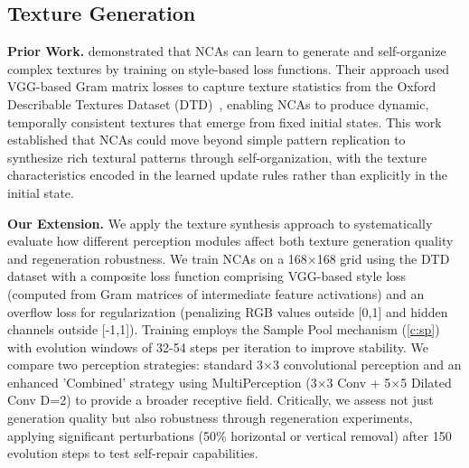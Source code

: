 \documentclass[10pt]{article} %
\begin{document}
\subsection{Texture Generation}
\label{sec:texture}
\noindent\textbf{Prior Work.}
\citep{niklasson2021self-organising} demonstrated that NCAs can learn to generate and self-organize complex textures by training on style-based loss functions. Their approach used VGG-based Gram matrix losses to capture texture statistics from the Oxford Describable Textures Dataset (DTD)~\citep{cimpoi14describing}, enabling NCAs to produce dynamic, temporally consistent textures that emerge from fixed initial states. This work established that NCAs could move beyond simple pattern replication to synthesize rich textural patterns through self-organization, with the texture characteristics encoded in the learned update rules rather than explicitly in the initial state.

\noindent\textbf{Our Extension.}
We apply the texture synthesis approach to systematically evaluate how different perception modules affect both texture generation quality and regeneration robustness. We train NCAs on a 168×168 grid using the DTD dataset with a composite loss function comprising VGG-based style loss (computed from Gram matrices of intermediate feature activations) and an overflow loss for regularization (penalizing RGB values outside [0,1] and hidden channels outside [-1,1]). Training employs the Sample Pool mechanism (\cref{c:sp}) with evolution windows of 32-54 steps per iteration to improve stability. We compare two perception strategies: standard 3×3 convolutional perception and an enhanced 'Combined' strategy using MultiPerception (3×3 Conv + 5×5 Dilated Conv D=2) to provide a broader receptive field. Critically, we assess not just generation quality but also robustness through regeneration experiments, applying significant perturbations (50\% horizontal or vertical removal) after 150 evolution steps to test self-repair capabilities.
\end{document}
